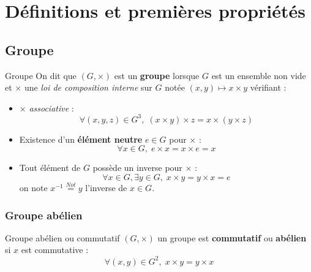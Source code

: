 
\chapter{Définitions et premières propriétés} %
\label{chap: Définitions et premières propriétés}

\section{Groupe} %
\label{sec:Groupe}

\begin{Definition}[colbacktitle=red!75!black]{Groupe}{}
On dit que $(G, \times)$ est un \textbf{groupe} lorsque $G$ est un ensemble non vide et $\times$ une \textit{loi de composition interne} sur $G$ notée $(x,y)\mapsto x \times y$ vérifiant : 
\begin{itemize}

    \item $\times$ \textit{associative} : 
      \begin{equation}
        \forall ( x, y, z) \in G ^{3}, \; (x \times y )\times z = x \times (y \times z) 
      \end{equation} 
    \item Existence d'un \textbf{élément neutre} $e \in G$ pour $\times$ : 
      \begin{equation}
        \forall x \in  G, \; e \times x = x \times e = x
      \end{equation}

    \item Tout élément de $G$ possède un inverse pour $\times$ : 
      \begin{equation}
        \forall x \in G, \exists y \in G,\; x \times y = y \times x = e
      \end{equation}
      on note $x ^{-1} \overset{Not}{=} y$ l'inverse de $x \in G$.

\end{itemize}
\end{Definition}

\subsection{Groupe abélien} %
\label{sub:Groupe abélien}

\begin{Definition}[colbacktitle=red!75!black]{Groupe abélien ou commutatif}{}
$(G, \times)$ un groupe est \textbf{commutatif} ou \textbf{abélien} si $x$ est commutative : 
\begin{equation}
  \forall (x,y) \in G ^{2}, \; x \times y = y \times x
\end{equation}
\end{Definition}

